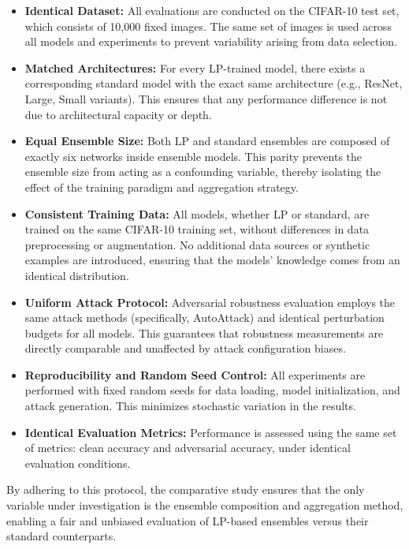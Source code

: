 \begin{itemize}
    \item \textbf{Identical Dataset:} All evaluations are conducted on the CIFAR-10 test set, which consists of 10,000 fixed images. The same set of images is used across all models and experiments to prevent variability arising from data selection.
    
    \item \textbf{Matched Architectures:} For every LP-trained model, there exists a corresponding standard model with the exact same architecture (e.g., ResNet, Large, Small variants). This ensures that any performance difference is not due to architectural capacity or depth.
    
    \item \textbf{Equal Ensemble Size:} Both LP and standard ensembles are composed of exactly six networks inside ensemble models. This parity prevents the ensemble size from acting as a confounding variable, thereby isolating the effect of the training paradigm and aggregation strategy.
    
    \item \textbf{Consistent Training Data:} All models, whether LP or standard, are trained on the same CIFAR-10 training set, without differences in data preprocessing or augmentation. No additional data sources or synthetic examples are introduced, ensuring that the models' knowledge comes from an identical distribution.
    
    \item \textbf{Uniform Attack Protocol:} Adversarial robustness evaluation employs the same attack methods (specifically, AutoAttack) and identical perturbation budgets for all models. This guarantees that robustness measurements are directly comparable and unaffected by attack configuration biases.
    
    \item \textbf{Reproducibility and Random Seed Control:} All experiments are performed with fixed random seeds for data loading, model initialization, and attack generation. This minimizes stochastic variation in the results.
    
    \item \textbf{Identical Evaluation Metrics:} Performance is assessed using the same set of metrics: clean accuracy and adversarial accuracy, under identical evaluation conditions.
\end{itemize}
By adhering to this protocol, the comparative study ensures that the only variable under investigation is the ensemble composition and aggregation method, enabling a fair and unbiased evaluation of LP-based ensembles versus their standard counterparts.